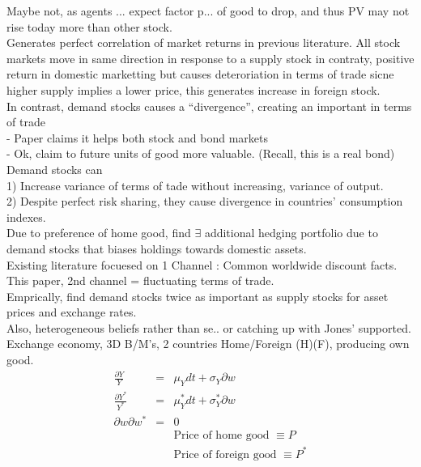 \documentclass[]{article}
\begin{document}
Maybe not, as agents ... expect factor p... of good to drop, and thus PV may not rise today more than other stock.\\

Generates perfect correlation of market returns in previous literature. All stock markets move in same direction in response to a supply stock in contraty, positive return in domestic marketting but causes deteroriation in terms of trade sicne higher supply implies a lower price, this generates increase in foreign stock.\\

In contrast, demand stocks causes a ``divergence'', creating an important in terms of trade \\
- Paper claims it helps both stock and bond markets\\
- Ok, claim to future units of good more valuable. (Recall, this is a real bond)\\

Demand stocks can \\
1) Increase variance of terms of tade without increasing, variance of output.\\
2) Despite perfect risk sharing, they cause divergence in countries' consumption indexes.\\

Due to preference of home good, find $\exists $ additional hedging portfolio due to demand stocks that biases holdings towards domestic assets.\\

Existing literature focuesed on 1 Channel : Common worldwide discount facts.\\
This paper, 2nd channel = fluctuating terms of trade.\\

Emprically, find demand stocks twice as important as supply stocks for asset prices and exchange rates.\\

Also, heterogeneous beliefs rather than se.. or catching up with Jones' supported.\\

Exchange economy, 3D B/M's, 2 countries Home/Foreign (H)(F), producing own good.
\begin{eqnarray*}
\frac{\partial Y}{Y} &=& \mu_Y dt + \sigma_Y \partial w \\
\frac{\partial Y^*}{Y^*} &=& \mu_Y^* dt + \sigma_Y^* \partial w \\
\partial w \partial w^* &=& 0\\
&& \mbox{Price of home good } \equiv P\\
&& \mbox{Price of foreign good } \equiv P^*
\end{eqnarray*}
\end{document}
